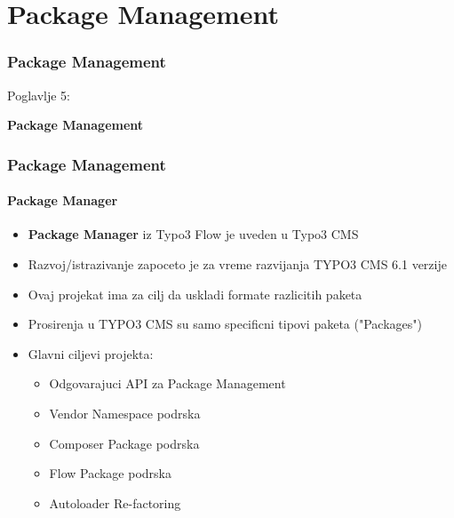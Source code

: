 %

\section{Package Management}
\begin{frame}[fragile]
	\frametitle{Package Management}

	\begin{center}\huge{Poglavlje 5:}\end{center}
	\begin{center}\huge{\color{typo3darkgrey}\textbf{Package Management}}\end{center}

\end{frame}


	\begin{frame}[fragile]
	\frametitle{Package Management}
	\framesubtitle{Package Manager}

	\begin{itemize}
		\item \textbf{Package Manager} iz Typo3 Flow je uveden u Typo3 CMS
		\item Razvoj/istrazivanje zapoceto je za vreme razvijanja TYPO3 CMS 6.1 verzije
		\item Ovaj projekat ima za cilj da uskladi formate razlicitih paketa
		\item Prosirenja u TYPO3 CMS su samo specificni tipovi paketa ("Packages")
		\item Glavni ciljevi projekta:

			\begin{itemize}
				\item Odgovarajuci API za Package Management
				\item Vendor Namespace podrska
				\item Composer Package podrska
				\item Flow Package podrska
				\item Autoloader Re-factoring
			\end{itemize}

	\end{itemize}

\end{frame}

